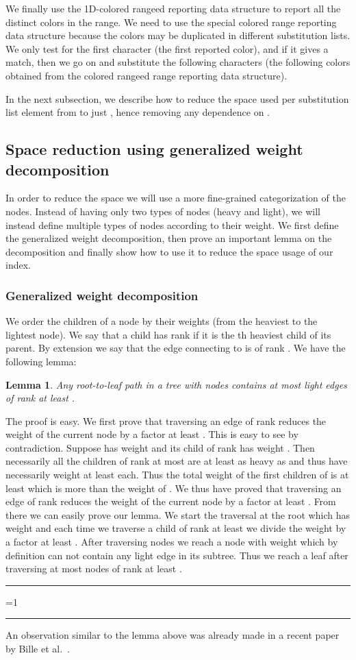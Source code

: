 \documentclass{article}
\newcommand{\?}{\mskip1.5mu}
\newtheorem{lemma}{Lemma}
\newcounter{noqed}
\newcommand{\qed}{ \ifmmode\mbox{
}\fi\rule[-.05em]{.3em}{.7em}\setcounter{noqed}{0}}
\newenvironment{proof}[1][{}]{\noindent{\bf Proof#1.
}\setcounter{noqed}{1}}{\ifnum\value{noqed}=1\qed\fi\par\medskip}
\begin{document}
We finally use the 1D-colored rangeed reporting data structure to report all the distinct colors in the range. We need to use the special colored range reporting data structure because the colors may be duplicated in different substitution lists. We only test for the first character (the first reported color), and if it gives a match, then we go on and substitute the following characters (the following colors obtained from the colored rangeed range reporting data structure). 



In the next subsection, we describe how to reduce the space used per substitution list element from  to just , hence removing any dependence on . 



\subsection{Space reduction using generalized weight decomposition}
\label{section:gen_weight_decomp}
In order to reduce the space we will use a more fine-grained categorization of the nodes. Instead of having only two types of nodes (heavy and light), we will instead define multiple types of nodes according to their weight. We first define the generalized weight decomposition, then prove an important lemma on the decomposition and finally show how to use it to reduce the space usage of our index. 
\subsubsection{Generalized weight decomposition}
We order the children of a node  by their weights (from the heaviest to the lightest node). We say that a child  has rank  if it is the th heaviest child of its parent. By extension we say that the edge connecting  to  is of rank . 
We have the following lemma:
\begin{lemma}
\label{lemma:heav_tree_lemma}
Any root-to-leaf path in a tree with  nodes contains at most  light edges of rank at least .
\end{lemma}
\begin{proof}
The proof is easy. We first prove that traversing an edge of rank  reduces the weight of the current node by a factor at least . This is easy to see by contradiction. Suppose  has weight  and its child  of rank  has weight . Then necessarily all the  children of rank at most  are at least as heavy as  and thus have necessarily weight at least  each. 
Thus the total weight of the first  children of  is at least  which is more than the weight of . 
We thus have proved that traversing an edge of rank  reduces the weight of the current node by a factor at least . 
From there we can easily prove our lemma. We start the traversal at the root which has weight  and each time we traverse a child of rank at least  we divide the weight by a factor at least . After traversing  nodes we reach a node with weight  which by definition can not contain any light edge in its subtree. Thus we reach a leaf after traversing at most  nodes of rank at least . 
\qed
\end{proof}
An observation similar to the lemma above was already made in a recent paper by Bille et al.~\cite{BGSV12}. 
\end{document}
